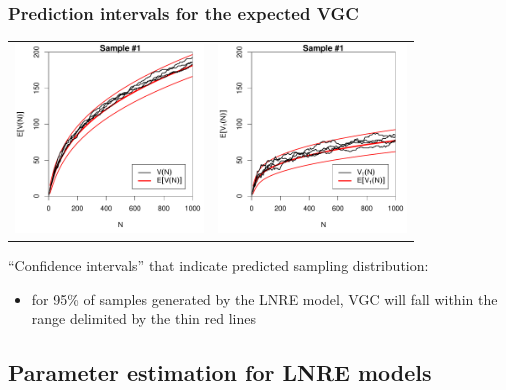 \documentclass[t]{beamer} %
\begin{document}
\begin{frame}
  \frametitle{Prediction intervals for the expected VGC}

  \ungap[1]
  \begin{center}
    \begin{tabular}{c @{} c}
      \includegraphics[width=50mm]{img/05-samples-vgc-exp-vs-samples-conf} &
      \includegraphics[width=50mm]{img/05-samples-vgc-V1-exp-vs-samples-conf}
    \end{tabular}
  \end{center}

  ``Confidence intervals'' that indicate predicted sampling distribution:%
  \begin{itemize}
  \item[\hand] for 95\% of samples generated by the LNRE model, VGC will fall within the range delimited by the thin red lines
  \end{itemize}

\end{frame}

\subsection{Parameter estimation for LNRE models }
\end{document}
